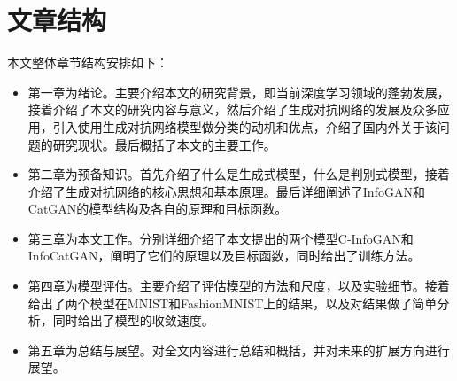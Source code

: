 \section{文章结构}
本文整体章节结构安排如下：
\begin{itemize}
  \item 第一章为绪论。主要介绍本文的研究背景，即当前深度学习领域的蓬勃发展，接着介绍了本文的研究内容与意义，然后介绍了生成对抗网络的发展及众多应用，引入使用生成对抗网络模型做分类的动机和优点，介绍了国内外关于该问题的研究现状。最后概括了本文的主要工作。
  \item 第二章为预备知识。首先介绍了什么是生成式模型，什么是判别式模型，接着介绍了生成对抗网络的核心思想和基本原理。最后详细阐述了InfoGAN和CatGAN的模型结构及各自的原理和目标函数。
  \item 第三章为本文工作。分别详细介绍了本文提出的两个模型C-InfoGAN和InfoCatGAN，阐明了它们的原理以及目标函数，同时给出了训练方法。
  \item 第四章为模型评估。主要介绍了评估模型的方法和尺度，以及实验细节。接着给出了两个模型在MNIST和FashionMNIST上的结果，以及对结果做了简单分析，同时给出了模型的收敛速度。
  \item 第五章为总结与展望。对全文内容进行总结和概括，并对未来的扩展方向进行展望。
\end{itemize}
